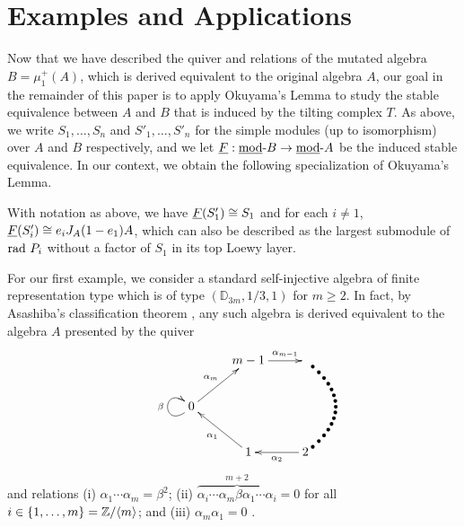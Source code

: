 \documentclass{amsart}
\begin{document}
\section{Examples and Applications}

Now that we have described the quiver and relations of the mutated algebra $B = \mu_1^+(A)$, which is derived equivalent to the original algebra $A$, our goal in the remainder of this paper is to apply Okuyama's Lemma to study the stable equivalence between $A$ and $B$ that is induced by the tilting complex $T$.  As above, we write $S_1, \ldots, S_n$ and $S'_1, \ldots, S'_n$ for the simple modules (up to isomorphism) over $A$ and $B$ respectively, and we let $\underline{F} : \mbox{\underline{mod}-} B \rightarrow \mbox{\underline{mod}-} A$ be the induced stable equivalence.  In our context, we obtain the following specialization of Okuyama's Lemma.

\begin{coro} With notation as above, we have $\underline{F}(S'_1) \cong S_1$ and for each $i \neq 1$, $\underline{F}(S'_i) \cong e_i J_A (1-e_1)A$, which can also be described as the largest submodule of $\mathrm{rad}\ P_i$ without a factor of $S_1$ in its top Loewy layer.
\end{coro}

For our first example, we consider a standard self-injective algebra of finite representation type which is of type  $(\mathbb{D}_{3m}, 1/3, 1)$ for $m \geq 2$.   In fact, by Asashiba's classification theorem \cite{DECSA}, any such algebra is derived equivalent to the algebra $A$ presented by the quiver
$$\xymatrix{ & m-1 \ar@{<-}[dl]_{\alpha_m} &   \ar@{<-}[l]_-{\alpha_{m-1}} \\ 0 \ar@(dl, ul)^{\beta} \ar@{<-}[dr]_{\alpha_1} \\ & 1 \ar@{<-}[r]_{\alpha_2}  & 2 \ar @{{}{*}} @/_2pc/[uu]}$$
and relations (i) $\alpha_1 \cdots \alpha_m = \beta^2$; (ii) $\overbrace{\alpha_i \cdots \alpha_m \beta \alpha _1 \cdots  \alpha_i}^{m+2} = 0$ for all $i \in \{1, \ldots, m\} = \mathbb{Z}/\langle m \rangle$; and (iii) $\alpha_m \alpha_1 = 0$ \cite{Asa2}. 
\end{document}
